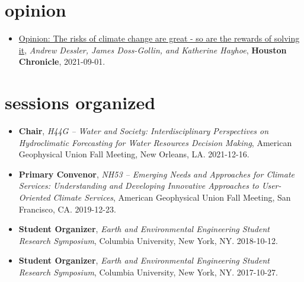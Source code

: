 \documentclass[10pt,oneside]{article}
\begin{document}
\section{opinion}

\mbox{}\vspace{-\dimexpr\baselineskip\relax}

\begin{itemize}[label={}]
  
  \item \href{https://www.houstonchronicle.com/opinion/outlook/article/Opinion-The-risks-of-climate-change-are-great-16426616.php}{Opinion: The risks of climate change are great - so are the rewards of solving it}, \textit{Andrew Dessler, James Doss-Gollin, and Katherine Hayhoe}, \textbf{Houston Chronicle}, 2021-09-01.
        
\end{itemize}


\section{sessions organized}

\mbox{}\vspace{-\dimexpr\baselineskip\relax}

\begin{itemize}[label={}]
  
  \item \textbf{Chair}, \textit{H44G -- Water and Society: Interdisciplinary Perspectives on Hydroclimatic Forecasting for Water Resources Decision Making}, American Geophysical Union Fall Meeting, New Orleans, LA. 2021-12-16.
        
  \item \textbf{Primary Convenor}, \textit{NH53 -- Emerging Needs and Approaches for Climate Services: Understanding and Developing Innovative Approaches to User-Oriented Climate Services}, American Geophysical Union Fall Meeting, San Francisco, CA. 2019-12-23.
        
  \item \textbf{Student Organizer}, \textit{Earth and Environmental Engineering Student Research Symposium}, Columbia University, New York, NY. 2018-10-12.
        
  \item \textbf{Student Organizer}, \textit{Earth and Environmental Engineering Student Research Symposium}, Columbia University, New York, NY. 2017-10-27.
        
\end{itemize}
\end{document}
